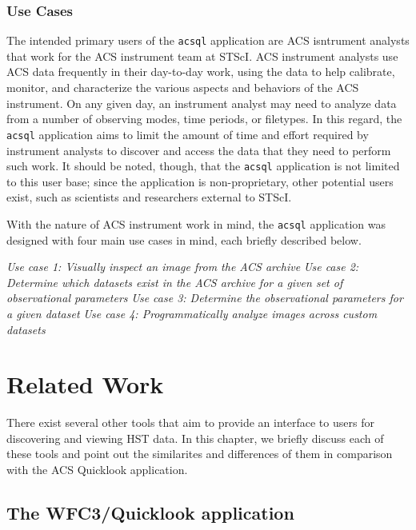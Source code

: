 \documentclass[10pt,journal,compsoc]{IEEEtran}
\begin{document}
\subsubsection{Use Cases}

The intended primary users of the \texttt{acsql} application are ACS isntrument analysts that
work for the ACS instrument team at STScI.  ACS instrument analysts use ACS data frequently
in their day-to-day work, using the data to help calibrate, monitor, and characterize the
various aspects and behaviors of the ACS instrument.  On any given day, an instrument analyst
may need to analyze data from a number of observing modes, time periods, or filetypes.  In this
regard, the \texttt{acsql} application aims to limit the amount of time and effort required by
instrument analysts to discover and access the data that they need to perform such work.
It should be noted, though, that the \texttt{acsql} application is not limited to this
user base; since the application is non-proprietary, other potential users exist, such as
scientists and researchers external to STScI.

With the nature of ACS instrument work in mind, the \texttt{acsql} application was designed
with four main use cases in mind, each briefly described below.

\textit{Use case 1: Visually inspect an image from the ACS archive}
\textit{Use case 2: Determine which datasets exist in the ACS archive for a given set of observational parameters}
\textit{Use case 3: Determine the observational parameters for a given dataset}
\textit{Use case 4: Programmatically analyze images across custom datasets}


\section{Related Work}\label{sec:related_work}

There exist several other tools that aim to provide an interface to users for discovering and viewing
HST data.  In this chapter, we briefly discuss each of these tools and point out the similarites
and differences of them in comparison with the ACS Quicklook application.


\subsection{The WFC3/Quicklook application}
\end{document}

